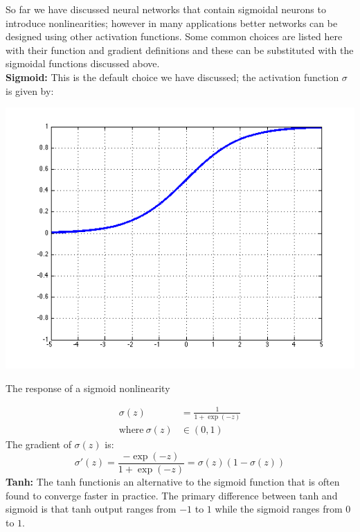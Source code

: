 \documentclass{tufte-handout}
\begin{document}
So far we have discussed neural networks that contain sigmoidal neurons to introduce nonlinearities; however in many applications better networks can be designed using other activation functions. Some common choices are listed here with their function and gradient definitions and these can be substituted with the sigmoidal functions discussed above.
$$ $$
\textbf{Sigmoid:} This is the default choice we have discussed; the activation function $\sigma$ is given by:
\begin{marginfigure}%
  \includegraphics[width=\linewidth]{graph_sigmoid}
  \caption{The response of a sigmoid nonlinearity}
  \label{fig:graph_sigmoid}
\end{marginfigure}
\begin{align*}
  \sigma(z) &= \frac{1}{1 + \operatorname{exp}(-z)}\\
  \text{where}~\sigma(z) &\in (0, 1)
\end{align*}
The gradient of $ \sigma(z) $ is:
$$ \sigma'(z) = \frac{- \operatorname{exp}(-z)}{1 +  \operatorname{exp}(-z)} = \sigma(z) (1 - \sigma(z))$$
\textbf{Tanh:} The tanh functionis an alternative to the sigmoid function that is often found to converge faster in practice. The primary difference between tanh and sigmoid is that tanh output ranges from $-1$ to $1$ while the sigmoid ranges from $0$ to $1$.
\end{document}
